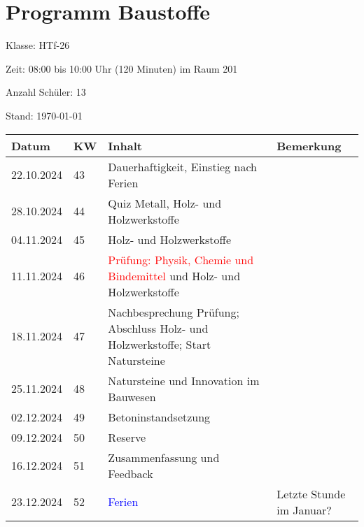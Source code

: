 \documentclass[
11pt,
captions=tableheading,
headings=big,
headsepline,
footsepline, 
captions=tableheading,
parskip=half-,
]{scrartcl}
\title{\fach}
\date{2024}
\newcommand{\klasse}{HTf-26\xspace}
\newcommand{\red}[1]{\textcolor{red}{#1}}
\begin{document}
\section*{Programm Baustoffe}

Klasse: \klasse

Zeit: 08:00 bis 10:00 Uhr (120 Minuten) im Raum 201

Anzahl Schüler: 13



Stand: \today

\vspace{1cm}



\begin{table}[H]
    \centering
    \begin{tabular}{llp{8cm}p{4cm}}
    \toprule
    Datum & KW  & Inhalt & Bemerkung \\
    \midrule
        22.10.2024 & 43 & Dauerhaftigkeit, Einstieg nach Ferien & {} \\
        28.10.2024 & 44 & Quiz Metall, Holz- und Holzwerkstoffe& {} \\
        04.11.2024 & 45 & Holz- und Holzwerkstoffe & {} \\
        11.11.2024 & 46 & \red{Prüfung: Physik, Chemie und Bindemittel} und Holz- und Holzwerkstoffe & {} \\
        18.11.2024 & 47 & Nachbesprechung Prüfung; Abschluss Holz- und Holzwerkstoffe; Start Natursteine& {} \\
        25.11.2024 & 48 & Natursteine  und Innovation im Bauwesen & {} \\
        02.12.2024 & 49 & Betoninstandsetzung& {} \\
        09.12.2024 & 50 & Reserve & {} \\
        16.12.2024 & 51 & Zusammenfassung und Feedback & {} \\
        23.12.2024 & 52 & \textcolor{blue}{Ferien} & Letzte Stunde im Januar? \\
    \bottomrule
    \end{tabular}
\end{table}
\end{document}
